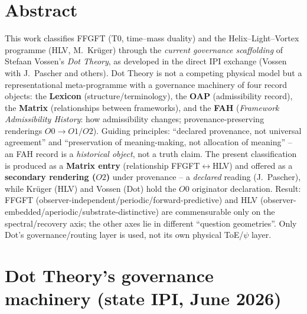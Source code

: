 
\section*{Abstract}
This work classifies FFGFT (T0, time--mass duality) and the Helix--Light--Vortex programme
(HLV, M.~Krüger) through the \emph{current governance scaffolding} of Stefaan Vossen's \emph{Dot Theory},
as developed in the direct IPI exchange (Vossen with J.~Pascher and others). Dot Theory is not a competing
physical model but a representational meta-programme with a governance machinery of four record objects:
the \textbf{Lexicon} (structure/terminology), the \textbf{OAP} (admissibility record), the \textbf{Matrix}
(relationships between frameworks), and the \textbf{FAH} (\emph{Framework Admissibility History}: how
admissibility changes; provenance-preserving renderings $O0 \to O1/O2$). Guiding principles:
\enquote{declared provenance, not universal agreement} and \enquote{preservation of meaning-making, not
allocation of meaning} -- an FAH record is a \emph{historical object}, not a truth claim. The present
classification is produced as a \textbf{Matrix entry} (relationship FFGFT$\leftrightarrow$HLV) and offered
as a \textbf{secondary rendering ($O2$)} under provenance -- a \emph{declared} reading (J.~Pascher), while
Krüger (HLV) and Vossen (Dot) hold the $O0$ originator declaration. Result: FFGFT
(observer-independent/periodic/forward-predictive) and HLV (observer-embedded/aperiodic/substrate-distinctive)
are commensurable only on the spectral/recovery axis; the other axes lie in different \enquote{question
geometries}. Only Dot's governance/routing layer is used, not its own physical ToE/$\psi$ layer.

\section{Dot Theory's governance machinery (state IPI, June 2026)}

